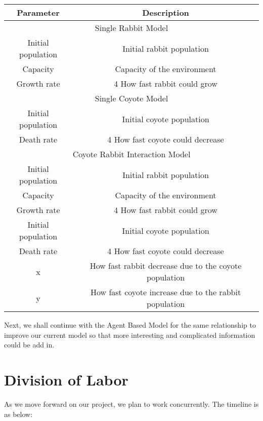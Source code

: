 \documentclass{article}
\begin{document}
\begin{normalsize}
	\begin{center}
		\begin{tabular}{ |c|c|} 
			\hline
			Parameter & Description  \\ 
			\hline
			\multicolumn{2}{|c|}{Single Rabbit Model} \\
			\hline
			Initial population & Initial rabbit population \\ 
			Capacity & Capacity of the environment\\ 
			Growth rate & 4 How fast rabbit could grow \\ 
			\hline
			\multicolumn{2}{|c|}{Single Coyote Model} \\
			\hline
			Initial population & Initial coyote population \\ 
			Death rate & 4 How fast coyote could decrease \\ 
			\hline
			\multicolumn{2}{|c|}{Coyote Rabbit Interaction Model} \\
			\hline
			Initial population & Initial rabbit population \\ 
			Capacity & Capacity of the environment\\ 
			Growth rate & 4 How fast rabbit could grow \\ 
			Initial population & Initial coyote population \\ 
			Death rate & 4 How fast coyote could decrease \\ 
			x & How fast rabbit decrease due to the coyote population \\
			y & How fast coyote increase due to the rabbit population \\
			\hline
		\end{tabular}
	\end{center}
		
		Next, we shall continue with the Agent Based Model for the same relationship to improve our current model so that more interesting and complicated information could be add in.
		
		\section{Division of Labor}
		As we move forward on our project, we plan to work concurrently. The timeline is as below:
		

\end{normalsize}
\end{document}
